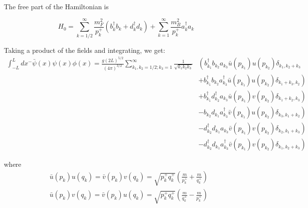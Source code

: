 The free part of the Hamiltonian is 

\begin{equation}
    H_0 = \sum_{k = 1/2}^\infty \frac{m_F^2}{p_k^+}\left(b_k^\dagger b_k + d_k^\dagger d_k \right) + \sum_{k = 1}^\infty \frac{m_B^2}{p_k^+}a_k^\dagger a_k 
\end{equation}

Taking a product of the fields and integrating, we get: 
\begin{align*}
    \int_{-L}^L dx^- \bar \psi(x) \psi(x) \phi(x)  = \frac{g(2L)^{5/2}}{(4\pi)^{3/2}} \sum_{k_1, k_2  = 1/2; k_3 = 1}^\infty \frac{1}{\sqrt{k_1k_2k_3}}& \left(  b_{k_1}^\dagger b_{k_2}a_{k_3}\bar u(p_{k_1})u(p_{k_2})\delta_{k_1, k_2 + k_3}  \right. \\
      &\left. + b_{k_1}^\dagger b_{k_2}a^\dagger_{k_3}\bar u(p_{k_1})u(p_{k_2})\delta_{k_1 + k_3, k_2} \right)\\
      &\left. + b_{k_1}^\dagger d_{k_2}^\dagger a_{k_3} \bar u(p_{k_1})v(p_{k_2})\delta_{k_1 + k_2, k_3} \right)\\
      &\left. -  b_{k_2}d_{k_1} a^\dagger_{k_3}\bar v(p_{k_1})u(p_{k_2})\delta_{k_3, k_1 + k_2} \right)\\
      &\left. -d_{k_2}^\dagger d_{k_1}  a_{k_3}\bar v(p_{k_1})v(p_{k_2})\delta_{k_2, k_1 + k_3} \right)\\
      &\left. -d_{k_2}^\dagger d_{k_1}  a^\dagger_{k_3}\bar v(p_{k_1})v(p_{k_2})\delta_{k_1, k_2 + k_3} \right)
\end{align*}

where 
\begin{align}
    &\bar u(p_k) u(q_k) = \bar v(p_k) v(q_k) = \sqrt{p_k^+ q_k^+}\left(\frac{m}{p_k^+} + \frac{m}{q_k^+} \right)\\
    &\bar u(p_k) v(q_k) = \bar v(p_k) u(q_k) = \sqrt{p_k^+ q_k^+}\left(\frac{m}{q_k^+} - \frac{m}{p_k^+} \right)
\end{align}



